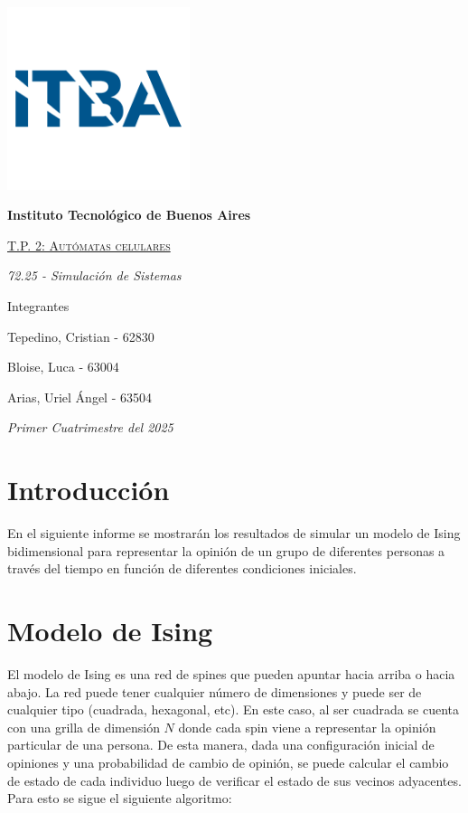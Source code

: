 \documentclass[12pt]{article}
\begin{document}
\begin{titlepage}
\begin{center}

{\includegraphics[width=0.4\textwidth]{itba-1.png}\par}
\vspace{1cm}
{\bfseries\LARGE Instituto Tecnológico de Buenos Aires \par}
\vspace{0.5cm}
{\scshape\Huge\underline {T.P. 2: Autómatas celulares} \par}
\vspace{0.4cm}
{\Large\itshape 72.25 - Simulación de Sistemas  \par}
\end{center}
\vfill

{\Large Integrantes \par}
\centering
{\Large Tepedino, Cristian - 62830 \par}
{\Large Bloise, Luca - 63004 \par}
{\Large Arias, Uriel Ángel - 63504 \par}

\vfill
{\Large\itshape Primer Cuatrimestre del 2025 \par}
\end{titlepage}

\setcounter{page}{0}
\tableofcontents
\clearpage

\section{Introducción}
En el siguiente informe se mostrarán los resultados de simular un modelo de Ising bidimensional para representar la opinión de un grupo de diferentes personas a través del tiempo en función de diferentes condiciones iniciales.

\section{Modelo de Ising}
El modelo de Ising es una red de spines que pueden apuntar hacia arriba o
hacia abajo. La red puede tener cualquier número de dimensiones y puede ser
de cualquier tipo (cuadrada, hexagonal, etc). En este caso, al ser cuadrada se cuenta con una grilla de dimensión $N$ donde cada spin viene a representar la opinión particular de una persona. De esta manera, dada una configuración inicial de opiniones y una probabilidad de cambio de opinión, se puede calcular el cambio de estado de cada individuo luego de verificar el estado de sus vecinos adyacentes. Para esto se sigue el siguiente algoritmo:
\end{document}
